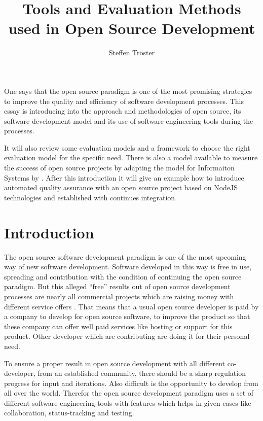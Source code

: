 \documentclass[DIV=calc,paper=a4,fontsize=9pt,twocolumn]{scrartcl}
\title{Tools and Evaluation Methods used in Open Source Development}
\author{Steffen Tröster \\}
\date{}
\newcommand{\initial}[1]{
     \lettrine[lines=2,lhang=0.3,nindent=0em]{
                    \color{headblue}
                    {\textsf{#1}}}{}}
\begin{document}
\maketitle
\thispagestyle{fancy}		

\initial{O}ne says that the open source paradigm is one of the most promising strategies to improve the quality and efficiency of software development processes. This essay is introducing into the approach and methodologies of open source, its software development model and its use of software engineering tools during the processes.

It will also review some evaluation models and a framework to choose the right evaluation model for the specific need. There is also a model available to measure the success of open source projects by adapting the model for Informaiton Systems by \citet{delone1992information}.  After this introduction it will give an example how to introduce automated quality assurance with an open source project based on NodeJS technologies and established with continues integration. 

\section{Introduction}

The open source software development paradigm is one of the most upcoming way of new software development. Software developed in this way is free in use, spreading and contribution with the condition of continuing the open source paradigm. But this alleged \enquote{free} results out of open source development processes are nearly all commercial projects which are raising money with different service offers \citep{Wheeler}. That means that a usual open source developer is paid by a company to develop for open source software, to improve the product so that these company can offer well paid services like hosting or support for this product. Other developer which are contributing are doing it for their personal need.

To ensure a proper result in open source development with all different co-developer, from an established community, there should be a sharp regulation progress for input and iterations. Also difficult is the opportunity to develop from all over the world. Therefor the open source development paradigm uses a set of different software engineering tools with features which helps in given cases like collaboration, status-tracking and testing.
\end{document}
